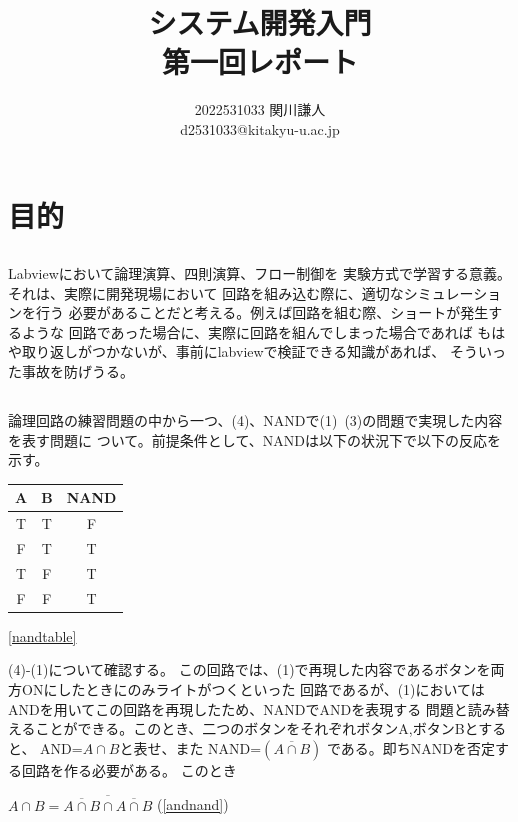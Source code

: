 \documentclass[a4paper,titlepage,11pt]{ltjsarticle}
\begin{document}
  \title{システム開発入門\\第一回レポート}
  \author{2022531033 関川謙人\\d2531033@kitakyu-u.ac.jp}
  \maketitle

  \section{目的}

  \subsection{}
  Labviewにおいて論理演算、四則演算、フロー制御を
  実験方式で学習する意義。それは、実際に開発現場において
  回路を組み込む際に、適切なシミュレーションを行う
  必要があることだと考える。例えば回路を組む際、ショートが発生するような
  回路であった場合に、実際に回路を組んでしまった場合であれば
  もはや取り返しがつかないが、事前にlabviewで検証できる知識があれば、
  そういった事故を防げうる。
  \subsection{}
論理回路の練習問題の中から一つ、(4)、NANDで(1)~(3)の問題で実現した内容を表す問題に
ついて。前提条件として、NANDは以下の状況下で以下の反応を示す。

\begin{tabular}{|c|c|c|}\hline
  A & B & NAND \\ \hline
  T & T & F \\ \hline
  F & T & T \\ \hline
  T & F & T \\ \hline
  F & F & T \\ \hline
\end{tabular}\label{nandtable}\ref{nandtable}

(4)-(1)について確認する。
この回路では、(1)で再現した内容であるボタンを両方ONにしたときにのみライトがつくといった
回路であるが、(1)においてはANDを用いてこの回路を再現したため、NANDでANDを表現する
問題と読み替えることができる。このとき、二つのボタンをそれぞれボタンA,ボタンBとすると、
AND=$A\cap B$と表せ、また
NAND=$(\overline{A\cap B} )$
である。即ちNANDを否定する回路を作る必要がある。
このとき

$A\cap B= \overline{\overline{A\cap B}\cap \overline{A\cap B}}$ \label{andnand}(\ref{andnand})
\end{document}
